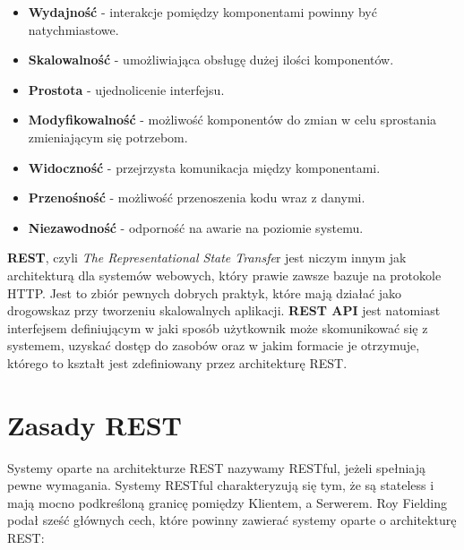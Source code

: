 \documentclass[oneside,polski,logo,indent]{amuthesis}
\begin{document}
\begin{itemize}
\item \textbf{Wydajność} - interakcje pomiędzy komponentami powinny być natychmiastowe.\newline
\item \textbf{Skalowalność}  - umożliwiająca obsługę dużej ilości komponentów.\newline
\item \textbf{Prostota} - ujednolicenie interfejsu.\newline
\item \textbf{Modyfikowalność}  - możliwość komponentów do zmian w celu sprostania zmieniającym się potrzebom.\newline
\item \textbf{Widoczność}  - przejrzysta komunikacja między komponentami.\newline
\item \textbf{Przenośność} - możliwość przenoszenia kodu wraz z danymi.\newline
\item \textbf{Niezawodność}  - odporność na awarie na poziomie systemu.\newline
\end{itemize}

\textbf{REST}, czyli \emph{The Representational State Transfe}r jest niczym innym jak architekturą dla systemów webowych, który prawie zawsze bazuje na protokole HTTP. Jest to zbiór pewnych dobrych praktyk, które mają działać jako drogowskaz przy tworzeniu skalowalnych aplikacji. \textbf{REST API} jest natomiast interfejsem definiującym w jaki sposób użytkownik może skomunikować się z systemem, uzyskać dostęp do zasobów oraz w jakim formacie je otrzymuje, którego to kształt jest zdefiniowany przez architekturę REST. 

\section{Zasady REST}

Systemy oparte na architekturze REST nazywamy RESTful, jeżeli spełniają pewne wymagania. Systemy RESTful charakteryzują się tym, że są stateless i mają mocno podkreśloną granicę pomiędzy Klientem, a Serwerem. Roy Fielding podał sześć głównych cech, które powinny zawierać systemy oparte o architekturę REST:\newline  
\end{document}
